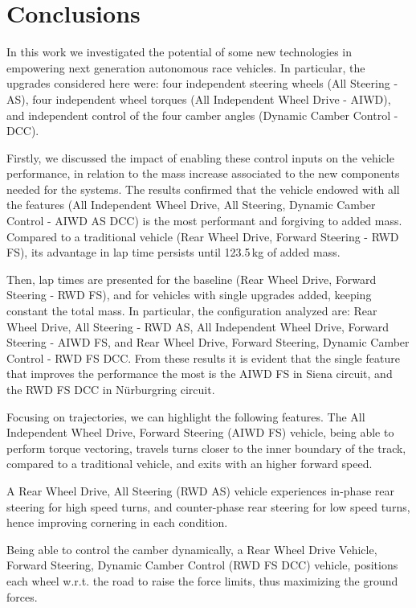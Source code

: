 \section{Conclusions}
\label{sec:conclusions}

In this work we investigated the potential of some new technologies in empowering next generation autonomous race vehicles. In particular, the upgrades considered here were: four independent steering wheels (All Steering - AS), four independent wheel torques (All Independent Wheel Drive - AIWD), and independent control of the four camber angles (Dynamic Camber Control - DCC).

Firstly, we discussed the impact of enabling these control inputs on the vehicle performance, in relation to the mass increase associated to the new components needed for the systems.
The results confirmed that the vehicle endowed with all the features (All Independent Wheel Drive, All Steering, Dynamic Camber Control - AIWD AS DCC) is the most performant and forgiving to added mass. Compared to a traditional vehicle (Rear Wheel Drive, Forward Steering - RWD FS), its advantage in lap time persists until 123.5\,kg of added mass.

Then, lap times are presented for the baseline (Rear Wheel Drive, Forward Steering - RWD FS), and for vehicles with single upgrades added, keeping constant the total mass.
In particular, the configuration analyzed are: Rear Wheel Drive, All Steering - RWD AS, All Independent Wheel Drive, Forward Steering - AIWD FS, and Rear Wheel Drive, Forward Steering, Dynamic Camber Control - RWD FS DCC.
From these results it is evident that the single feature that improves the performance the most is the AIWD FS in Siena circuit, and the RWD FS DCC in N\"{u}rburgring circuit.

Focusing on trajectories, we can highlight the following features. The All Independent Wheel Drive, Forward Steering (AIWD FS) vehicle, being able to perform torque vectoring, travels turns closer to the inner boundary of the track, compared to a traditional vehicle, and exits with an higher forward speed.

A Rear Wheel Drive, All Steering (RWD AS) vehicle experiences in-phase rear steering for high speed turns, and counter-phase rear steering for low speed turns, hence improving cornering in each condition.

Being able to control the camber dynamically, a Rear Wheel Drive Vehicle, Forward Steering, Dynamic Camber Control (RWD FS DCC) vehicle, positions each wheel w.r.t. the road to raise the force limits, thus maximizing the ground forces.

